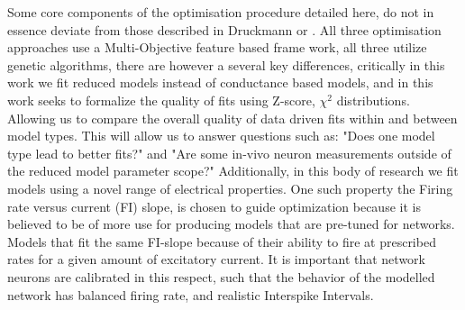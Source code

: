 Some core components of the optimisation procedure detailed here, do not in essence deviate from those described in Druckmann \cite{druckmann2008evaluating} or \cite{bluepyopt}. All three optimisation approaches use a Multi-Objective feature based frame work, all three utilize genetic algorithms, there are however a several key differences, critically in this work we fit reduced models instead of conductance based models, and in this work seeks to formalize the quality of fits using Z-score, $\chi^{2}$ distributions. Allowing us to compare the overall quality of data driven fits within and between model types. This will allow us to answer questions such as: "Does one model type lead to better fits?" and "Are some in-vivo neuron measurements outside of the reduced model parameter scope?" Additionally, in this body of research we fit models using a novel range of electrical properties. One such property the Firing rate versus current (FI) slope, is chosen to guide optimization because it is believed to be of more use for producing models that are pre-tuned for networks. Models that fit the same FI-slope because of their ability to fire at prescribed rates for a given amount of excitatory current. It is important that network neurons are calibrated in this respect, such that the behavior of the modelled network has  balanced firing rate, and realistic Interspike Intervals.